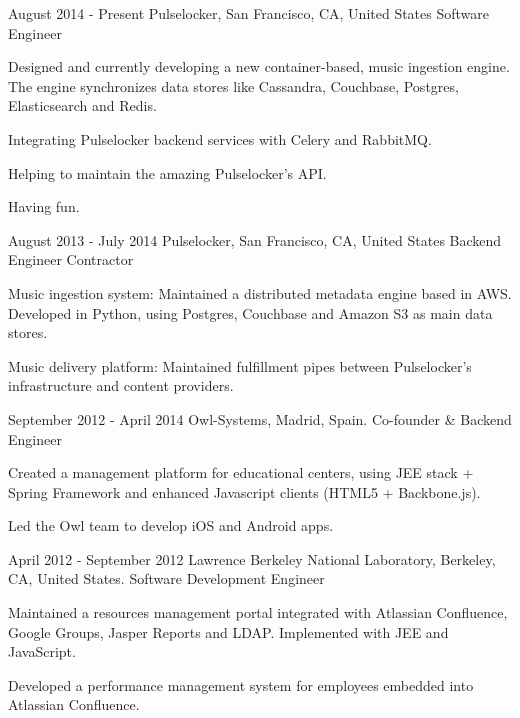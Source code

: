 
\experience
  {August 2014 - Present}
  {Pulselocker, San Francisco, CA, United States}
  {Software Engineer}
  {\vspace{-1em}\begin{rlist}
    \item Designed and currently developing a new container-based, music ingestion engine. The engine
    synchronizes data stores like Cassandra, Couchbase, Postgres, Elasticsearch and Redis.
    \item Integrating Pulselocker backend services with Celery and RabbitMQ.
    \item Helping to maintain the amazing Pulselocker's API.
    \item Having fun.
  \end{rlist}}

\experience
  {August 2013 - July 2014}
  {Pulselocker, San Francisco, CA, United States}
  {Backend Engineer Contractor}
  {\vspace{-1em}\begin{rlist}
    \item Music ingestion system: Maintained a distributed metadata engine based in AWS. Developed
    in Python, using Postgres, Couchbase and Amazon S3 as main data stores.
    \item Music delivery platform: Maintained fulfillment pipes between Pulselocker's
    infrastructure and content providers.
  \end{rlist}}

\experience
  {September 2012 - April 2014}
  {Owl-Systems, Madrid, Spain.}
  {Co-founder \& Backend Engineer}
  {\vspace{-1em}\begin{rlist}
    \item Created a management platform for educational centers, using JEE stack + Spring
    Framework and enhanced Javascript clients (HTML5 + Backbone.js).
    \item Led the Owl team to develop iOS and Android apps.
  \end{rlist}}

\experience
  {April 2012 - September 2012}
  {Lawrence Berkeley National Laboratory, Berkeley, CA, United States.}
  {Software Development Engineer}
  {\vspace{-1em}\begin{rlist}
    \item Maintained a resources management portal integrated with Atlassian Confluence,
    Google Groups, Jasper Reports and LDAP. Implemented with JEE and JavaScript.
    \item Developed a performance management system for employees embedded into Atlassian Confluence.
  \end{rlist}}

